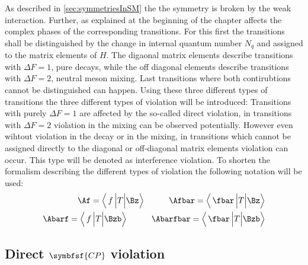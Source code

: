 As described in \cref{sec:symmetriesInSM} the the \CP symmetry is broken by the weak interaction.
Further, as explained at the beginning of the chapter \CP affects the complex phases of the corresponding transitions.
For this first the transitions shall be distinguished by the change in internal quantum number $N_q$ and assigned to the matrix elements of $H$.
The digaonal matrix elements describe transitions with $\Delta F=1$, \ie pure decays, while the off diagonal elements describe transitions with $\Delta F=2$, \ie neutral meson mixing.
Last transitions where both contirubtions cannot be distinguished can happen.
Using these three different types of transitions the three different types of \CP violation will be introduced:
Transitions with purely $\Delta F=1$ are affected by the so-called direct \CP violation, in transitions with $\Delta F=2$ \CP violation in the mixing can be observed potentially.
However even wihtout \CP violation in the decay or in the mixing, in transitions which cannot be assigned directly to the diagonal or off-diagonal matrix elements \CP violation can occur.
This type will be denoted as interference \CP violation.
To shorten the formalism describing the different types of \CP violation the following notation will be used:
\begin{equation}
\begin{split}
\Af = \left<\,f\,\Big|T\Big|\Bz\right>\hspace{1cm}\Afbar = \left<\,\fbar\,\Big|T\Big|\Bz\right>\\
\Abarf = \left<\,f\,\Big|T\Big|\Bzb\right>\hspace{1cm}\Abarfbar = \left<\,\fbar\,\Big|T\Big|\Bzb\right>
\end{split}
\end{equation}

\subsection[head={Direct \CP violation},tocentry={Direct \CP violation}]{Direct $\symbfsf{C{}P}$ violation}
\label{sec:DirectCPV}

